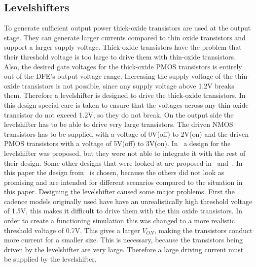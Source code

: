 \makeatletter
\newcommand*{\textoverline}[1]{$\overline{\hbox{#1}}\m@th$}
\makeatother

\subsection{Levelshifters}\label{sec:levelshifter}
To generate sufficient output power thick-oxide transistors are used at the output stage. They can generate larger currents compared to thin oxide transistors and support a larger supply voltage. Thick-oxide transistors have the problem that their threshold voltage is too large to drive them with thin-oxide transistors. Also, the desired gate voltages for the thick-oxide PMOS transistors is entirely out of the DFE's output voltage range. Increasing the supply voltage of the thin-oxide transistors is not possible, since any supply voltage above 1.2V breaks them. Therefore a levelshifter is designed to drive the thick-oxide transistors. In this design special care is taken to ensure that the voltages across any thin-oxide transistor do not exceed 1.2V, so they do not break. On the output side the levelshifter has to be able to drive very large transistors. The driven NMOS transistors has to be supplied with a voltage of 0V(off) to 2V(on) and the driven PMOS transistors with a voltage of 5V(off) to 3V(on). 
In~\cite{powerdac} a design for the levelshifter was proposed, but they were not able to integrate it with the rest of their design. Some other designs that were looked at are proposed in~\cite{koo2005new} and~\cite{hass2000level}. In this paper the design from~\cite{powerdac} is chosen, because the others did not look as promising and are intended for different scenarios compared to the situation in this paper. Designing the levelshifter caused some major problems. First the cadence models originally used have have an unrealistically high threshold voltage of 1.5V, this makes it difficult to drive them with the thin oxide transistors. In order to create a functioning simulation this was changed to a more realistic threshold voltage of 0.7V. This gives a larger $V_{ON}$, making the transistors conduct more current for a smaller size. This is necessary, because the transistors being driven by the levelshifter are very large. Therefore a large driving current must be supplied by the levelshifter.
